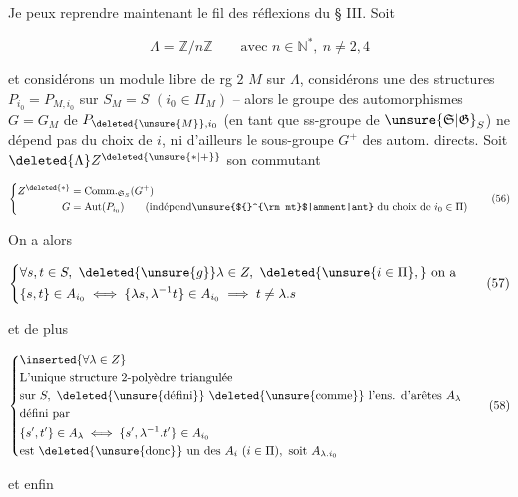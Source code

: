 
Je peux reprendre maintenant le fil des réflexions du § III. Soit

\[
\Lambda=\mathbb Z/n\mathbb Z\qquad\text{avec }n\in\mathbb N^{*},\ n\ne 2,4
\]

et considérons un module libre de rg $2$ $M$ sur $\Lambda$, considérons une des structures $P_{i_0}=P_{M,i_0}$ sur $S_M=S$ $(i_0\in\Pi_M)$ -- alors le groupe des automorphismes $G=G_M$ de $P_{\deleted{\unsure{M}},i_0}$ (en tant que ss-groupe de $\unsure{\mathfrak S|\mathfrak G}_S$) ne dépend pas du choix de $i$, ni d'ailleurs le sous-groupe $G^+$ des autom. directs. Soit $\deleted{\Lambda} Z^{\deleted{\unsure{*|+}}}$ son commutant

\[
\left\{\begin{aligned}
 Z^{\deleted{*}}&=\operatorname{Comm.}_{\mathfrak S_S}(G^+)\\
 G&=\operatorname{Aut}(P_{i_0})\qquad\text{(indépend\unsure{${}^{\rm mt}$|amment|ant} du choix de }i_0\in\Pi\text{)}
\end{aligned}\right. \tag*{(56)}
\]

On a alors

\[
\left\{\begin{aligned}
 &\forall s,t\in S,\ \deleted{\unsure{g}}\lambda\in Z,\ \deleted{\unsure{i\in\Pi},}\ \text{on a}\\
 &\{s,t\}\in A_{i_0}\iff \{\lambda s,\lambda^{-1}t\}\in A_{i_0}\implies t\ne\lambda.s
\end{aligned}\right. \tag*{(57)}
\]

et de plus

\[
\left\{\begin{aligned}
 &\inserted{\forall\lambda\in Z}\\
 &\text{L'unique structure 2-polyèdre triangulée}\\
 &\text{sur }S,\ \deleted{\text{\unsure{défini}}}\ \deleted{\text{\unsure{comme}}}\ \text{l'ens. d'arêtes }A_\lambda\\
 &\text{défini par}\\
 &\{s',t'\}\in A_\lambda\iff\{s',\lambda^{-1}.t'\}\in A_{i_0}\\
 &\text{est }\deleted{\text{\unsure{donc}}}\ \text{un des }A_i\ (i\in\Pi),\ \text{soit }A_{\lambda.i_0}
\end{aligned}\right. \tag*{(58)}
\]

et enfin
